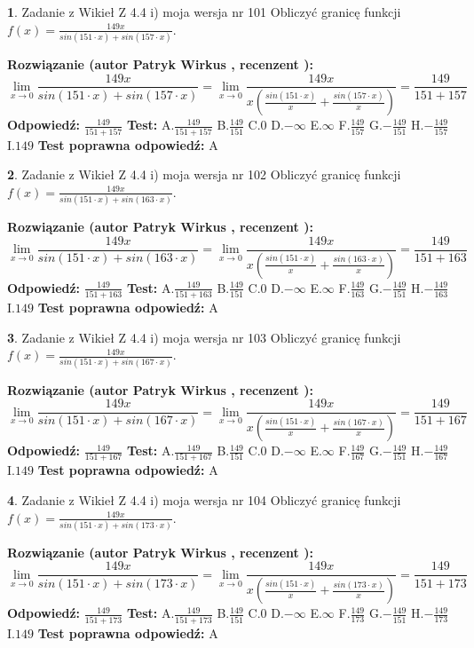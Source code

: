 \documentclass[12pt, a4paper]{article}
\theoremstyle{definition} %
\newtheorem{zad}{}
\newcommand{\zadStart}[1]{\begin{zad}#1\newline}
\newcommand{\zadStop}{\end{zad}}
\newcommand{\rozwStart}[2]{\noindent \textbf{Rozwiązanie (autor #1 , recenzent #2): }\newline}
\newcommand{\rozwStop}{\newline}
\newcommand{\odpStart}{\noindent \textbf{Odpowiedź:}\newline}
\newcommand{\odpStop}{\newline}
\newcommand{\testStart}{\noindent \textbf{Test:}\newline}
\newcommand{\testStop}{\newline}
\newcommand{\kluczStart}{\noindent \textbf{Test poprawna odpowiedź:}\newline}
\newcommand{\kluczStop}{\newline}
\begin{document}
\zadStart{Zadanie z Wikieł Z 4.4 i) moja wersja nr 101}
Obliczyć granicę funkcji $f(x)=\frac{149x}{sin(151\cdot x) +sin(157\cdot x)}$.
\zadStop
\rozwStart{Patryk Wirkus}{}
$$\lim\limits_{x\to 0}\frac{149x}{sin(151\cdot x) +sin(157\cdot x)}=\lim\limits_{x\to 0}\frac{149x}{x(\frac{sin(151\cdot x)}{x}+\frac{sin(157\cdot x)}{x})}=\frac{149}{151+157}$$
\rozwStop
\odpStart
$\frac{149}{151+157}$
\odpStop
\testStart
A.$\frac{149}{151+157}$
B.$\frac{149}{151}$
C.$0$
D.$-\infty$
E.$\infty$
F.$\frac{149}{157}$
G.$-\frac{149}{151}$
H.$-\frac{149}{157}$
I.$149$
\testStop
\kluczStart
A
\kluczStop



\zadStart{Zadanie z Wikieł Z 4.4 i) moja wersja nr 102}
Obliczyć granicę funkcji $f(x)=\frac{149x}{sin(151\cdot x) +sin(163\cdot x)}$.
\zadStop
\rozwStart{Patryk Wirkus}{}
$$\lim\limits_{x\to 0}\frac{149x}{sin(151\cdot x) +sin(163\cdot x)}=\lim\limits_{x\to 0}\frac{149x}{x(\frac{sin(151\cdot x)}{x}+\frac{sin(163\cdot x)}{x})}=\frac{149}{151+163}$$
\rozwStop
\odpStart
$\frac{149}{151+163}$
\odpStop
\testStart
A.$\frac{149}{151+163}$
B.$\frac{149}{151}$
C.$0$
D.$-\infty$
E.$\infty$
F.$\frac{149}{163}$
G.$-\frac{149}{151}$
H.$-\frac{149}{163}$
I.$149$
\testStop
\kluczStart
A
\kluczStop



\zadStart{Zadanie z Wikieł Z 4.4 i) moja wersja nr 103}
Obliczyć granicę funkcji $f(x)=\frac{149x}{sin(151\cdot x) +sin(167\cdot x)}$.
\zadStop
\rozwStart{Patryk Wirkus}{}
$$\lim\limits_{x\to 0}\frac{149x}{sin(151\cdot x) +sin(167\cdot x)}=\lim\limits_{x\to 0}\frac{149x}{x(\frac{sin(151\cdot x)}{x}+\frac{sin(167\cdot x)}{x})}=\frac{149}{151+167}$$
\rozwStop
\odpStart
$\frac{149}{151+167}$
\odpStop
\testStart
A.$\frac{149}{151+167}$
B.$\frac{149}{151}$
C.$0$
D.$-\infty$
E.$\infty$
F.$\frac{149}{167}$
G.$-\frac{149}{151}$
H.$-\frac{149}{167}$
I.$149$
\testStop
\kluczStart
A
\kluczStop



\zadStart{Zadanie z Wikieł Z 4.4 i) moja wersja nr 104}
Obliczyć granicę funkcji $f(x)=\frac{149x}{sin(151\cdot x) +sin(173\cdot x)}$.
\zadStop
\rozwStart{Patryk Wirkus}{}
$$\lim\limits_{x\to 0}\frac{149x}{sin(151\cdot x) +sin(173\cdot x)}=\lim\limits_{x\to 0}\frac{149x}{x(\frac{sin(151\cdot x)}{x}+\frac{sin(173\cdot x)}{x})}=\frac{149}{151+173}$$
\rozwStop
\odpStart
$\frac{149}{151+173}$
\odpStop
\testStart
A.$\frac{149}{151+173}$
B.$\frac{149}{151}$
C.$0$
D.$-\infty$
E.$\infty$
F.$\frac{149}{173}$
G.$-\frac{149}{151}$
H.$-\frac{149}{173}$
I.$149$
\testStop
\kluczStart
A
\kluczStop
\end{document}
